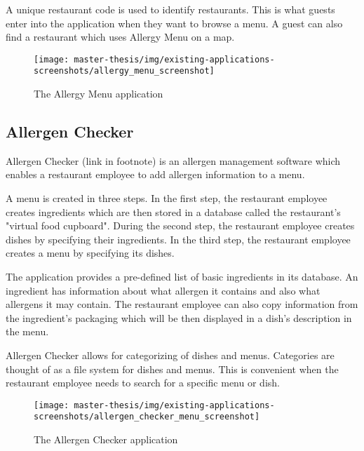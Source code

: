   A unique restaurant code is used to identify restaurants. 
  This is what guests enter into the application when they want to browse a menu.
  A guest can also find a restaurant which uses Allergy Menu on a map.

  \begin{figure}[h]
    \centering
    \texttt{[image: master-thesis/img/existing-applications-screenshots/allergy\_menu\_screenshot]}
    \caption{The Allergy Menu application}
  \end{figure}

\subsection*{Allergen Checker}
  Allergen Checker (link in footnote) is an allergen management software which enables a restaurant employee to add allergen information to a menu.
  
  A menu is created in three steps.
  In the first step, the restaurant employee creates ingredients which are then stored in a database called the restaurant's "virtual food cupboard".
  During the second step, the restaurant employee creates dishes by specifying their ingredients.
  In the third step, the restaurant employee creates a menu by specifying its dishes.
  
  The application provides a pre-defined list of basic ingredients in its database.
  An ingredient has information about what allergen it contains and also what allergens it may contain. 
  The restaurant employee can also copy information from the ingredient's packaging which will be then displayed in a dish's description in the menu.
  
  Allergen Checker allows for categorizing of dishes and menus. 
  Categories are thought of as a file system for dishes and menus.
  This is convenient when the restaurant employee needs to search for a specific menu or dish.

  \begin{figure}[h]
    \centering
    \texttt{[image: master-thesis/img/existing-applications-screenshots/allergen\_checker\_menu\_screenshot]}
    \caption{The Allergen Checker application}
  \end{figure}

